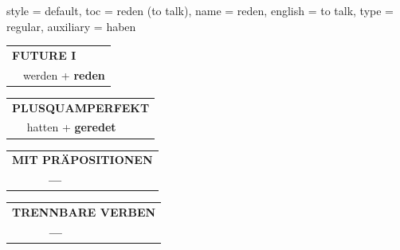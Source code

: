 \begin{verbentry}{
  style = {default},
  toc = {reden (to talk)},
  name = {reden},
  english = {to talk},
  type = {regular},
  auxiliary = {haben}
}
\begin{tabular}{rl}
    \multicolumn{2}{l}{\textbf{FUTURE I} }\\
  &  werden + \textbf{reden}\\
 
  \end{tabular}
\hfill
   \begin{tabular}{rl}
      \multicolumn{2}{l}{\textbf{PLUSQUAMPERFEKT}}\\
  &  hatten + \textbf{geredet}\\
  \end{tabular}
  
  \vspace{10pt}



\begin{tabular}{lll}
\multicolumn{3}{l}{\textbf{MIT PRÄPOSITIONEN}}\\
& \textbf{---} & \\
\end{tabular}
\hfill
\begin{tabular}{lll}
\multicolumn{3}{l}{\textbf{TRENNBARE VERBEN}}\\
& \textbf{---} & \\
\end{tabular}

  \vspace{-5pt}
\end{verbentry}


